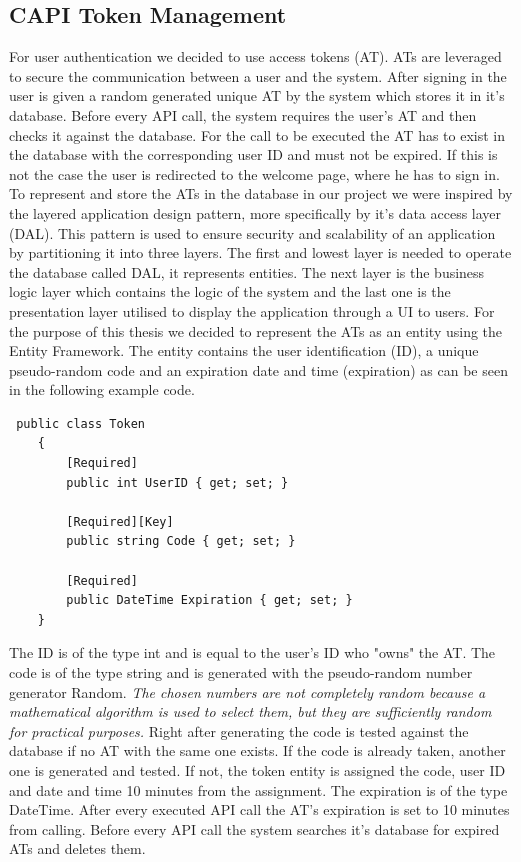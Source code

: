 \subsection{CAPI Token Management}
For user authentication we decided to use access tokens (AT). ATs are leveraged to secure the communication between a user and the system. After signing in the user is given a random generated unique AT by the system which stores it in it's database. Before every API call, the system requires the user's AT and then checks it against the database. For the call to be executed the AT has to exist in the database with the corresponding user ID and must not be expired. If this is not the case the user is redirected to the welcome page, where he has to sign in. To represent and store the ATs in the database in our project we were inspired by the layered application design pattern, more specifically by it's data access layer (DAL). This pattern is used to ensure security and scalability of an application by partitioning it into three layers. The first and lowest layer is needed to operate the database called DAL, it represents entities. The next layer is the business logic layer which contains the logic of the system and the last one is the presentation layer utilised to display the application through a UI to users. For the purpose of this thesis we decided to represent the ATs as an entity using the Entity Framework. The entity contains the user identification (ID), a unique pseudo-random code and an expiration date and time (expiration) as can be seen in the following example code. 
\lstset{style=sharpc}
\begin{lstlisting}
 public class Token
    {
        [Required]
        public int UserID { get; set; }

        [Required][Key]
        public string Code { get; set; }

        [Required]
        public DateTime Expiration { get; set; }
    }
\end{lstlisting}
The ID is of the type int and is equal to the user's ID who "owns" the AT. The code is of the type string and is generated with the pseudo-random number generator Random. \textit{The chosen numbers are not completely random because a mathematical algorithm is used to select them, but they are sufficiently random for practical purposes.}\cite{msdn_documentation_system_random} Right after generating the code is tested against the database if no AT with the same one exists. If the code is already taken, another one is generated and tested. If not, the token entity is assigned the code, user ID and date and time 10 minutes from the assignment. The expiration is of the type DateTime. After every executed API call the AT's expiration is set to 10 minutes from calling. 
Before every API call the system searches it's database for expired ATs and deletes them. 

